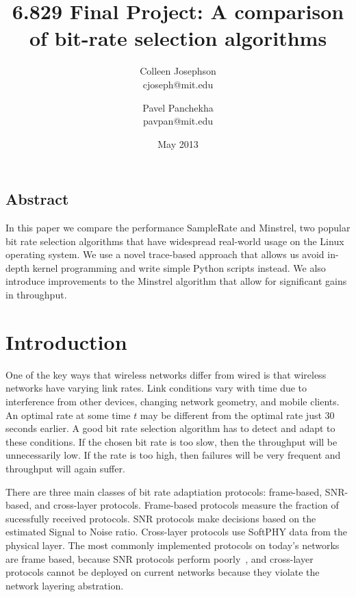 \documentclass[letterpaper,twocolumn,10pt]{article}
\begin{document}

\title{\Large \bf 6.829 Final Project: A comparison of bit-rate selection algorithms}
\author{
{\rm Colleen Josephson}\\
cjoseph@mit.edu
\and
{\rm Pavel Panchekha}\\
pavpan@mit.edu
} %

\date{May 2013}

\maketitle


\subsection*{Abstract}
In this paper we compare the performance SampleRate and Minstrel, two popular bit rate selection algorithms that have widespread real-world usage on the Linux operating system. We use a novel trace-based approach that allows us avoid in-depth kernel programming and write simple Python scripts instead. We also introduce improvements to the Minstrel algorithm that allow for significant gains in throughput. 
\section{Introduction}

One of the key ways that wireless networks differ from wired is that wireless networks have varying link rates. Link conditions vary with time due to interference from other devices, changing network geometry, and mobile clients. An optimal rate at some time $t$ may be different from the optimal rate just 30 seconds earlier. A good bit rate selection algorithm has to detect and adapt to these conditions. If the chosen bit rate is too slow, then the throughput will be unnecessarily low. If the rate is too high, then failures will be very frequent and throughput will again suffer. 

There are three main classes of bit rate adaptiation protocols: frame-based, SNR-based, and cross-layer protocols. Frame-based protocols measure the fraction of sucessfully received protocols. SNR protocols make decisions based on the estimated Signal to Noise ratio. Cross-layer protocols use SoftPHY data from the physical layer. The most commonly implemented protocols on today's networks are frame based, because SNR protocols perform poorly~\cite{samplerate}, and cross-layer protocols cannot be deployed on current networks because they violate the network layering abstration. 
\end{document}
